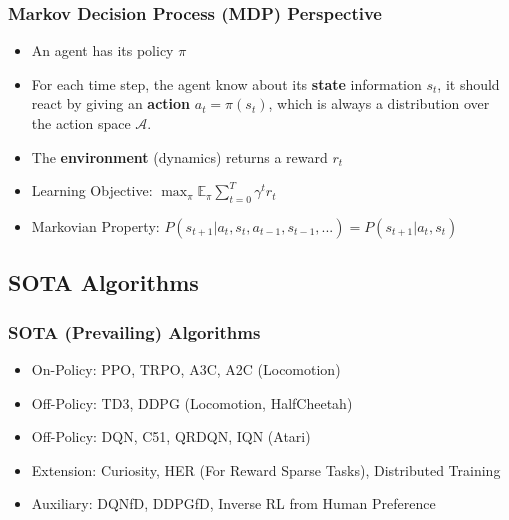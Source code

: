 \documentclass[10pt,hyperref={CJKbookmarks=true},envcountsect,mathserif]{beamer}
\begin{document}
\begin{frame}
\frametitle{Markov Decision Process (MDP) Perspective}
\begin{itemize}
	\item An agent has its policy $\pi$
	\item For each time step, the agent know about its \textbf{state} information $s_t$, it should react by giving an \textbf{action} $a_t = \pi(s_t)$, which is always a distribution over the action space $\mathcal{A}$.
	\item The \textbf{environment} (dynamics) returns a reward $r_t$
	\item Learning Objective: $\max_{\pi} \mathbb{E}_{\pi}\sum_{t=0}^T \gamma^t r_t$
	\item Markovian Property: $P(s_{t+1}|a_{t},s_{t},a_{t-1},s_{t-1},...) = P(s_{t+1}|a_{t},s_{t})$
\end{itemize}



\end{frame}


\subsection{SOTA Algorithms}
\begin{frame}
\frametitle{SOTA (Prevailing) Algorithms}
\begin{itemize}
	\item On-Policy: PPO, TRPO, A3C, A2C (Locomotion)
	\item Off-Policy: TD3, DDPG (Locomotion, HalfCheetah)
	\item Off-Policy: DQN, C51, QRDQN, IQN (Atari)
	\item Extension: Curiosity, HER (For Reward Sparse Tasks), Distributed Training
	\item Auxiliary: DQNfD, DDPGfD, Inverse RL from Human Preference
\end{itemize}


\end{frame}
\end{document}
